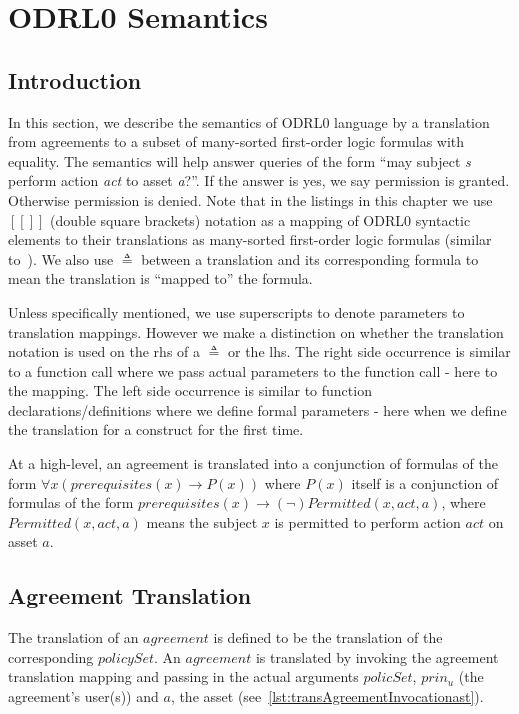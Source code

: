 \chapter{ODRL0 Semantics}\label{chap:semantics}

                  
\section{Introduction}\label{sec:introsemantics}


In this section, we describe the semantics of ODRL0 language by a translation from agreements to a subset of many-sorted first-order logic formulas with equality. The semantics will help answer queries of the form ``may subject \emph{s} perform action \emph{act} to asset \emph{a}?''. If the answer is yes, we say permission is granted. Otherwise permission is denied. Note that in the listings in this chapter we use $[\![]\!]$ (double square brackets) notation as a mapping of ODRL0 syntactic elements to their translations as many-sorted first-order logic formulas (similar to~\cite{pucella2006}). We also use $\triangleq$ between a translation and its corresponding formula to mean the translation is ``mapped to'' the formula. 

Unless specifically mentioned, we use superscripts to denote parameters to translation mappings. However we make a distinction on whether the translation notation is used on the \ac{rhs} of a $\triangleq$ or the \ac{lhs}. The right side occurrence is similar to a function call where we pass actual parameters to the function call - here to the mapping. The left side occurrence is similar to function declarations/definitions where we define formal parameters - here when we define the translation for a construct for the first time. 


At a high-level, an agreement is translated into a conjunction of formulas of the form $\forall x ( prerequisites(x) \rightarrow P(x))$ where $P(x)$ itself is a conjunction of formulas of the form $ prerequisites(x) \rightarrow (\lnot) Permitted (x, act, a)$, where $Permitted (x, act, a)$ means the subject $x$ is permitted to perform action $act$ on asset $a$.

\section{Agreement Translation}
The translation of an $agreement$ is defined to be the translation of the corresponding $policySet$. An $agreement$ is translated by invoking the agreement translation mapping and passing in the actual arguments $policSet$, $prin_{u}$ (the agreement's user(s)) and $a$, the asset (see~\ref{lst:transAgreementInvocationast}). 

